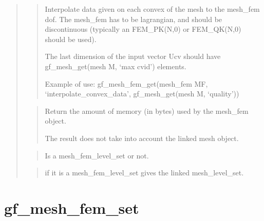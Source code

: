 \documentclass[a4paper,11pt,english]{sphinxmanual}
\begin{document}
\begin{quote}
\begin{quote}
\sphinxAtStartPar
Interpolate data given on each convex of the mesh to the mesh\_fem dof.
The mesh\_fem has to be lagrangian, and should be discontinuous (typically
an FEM\_PK(N,0) or FEM\_QK(N,0) should be used).

\sphinxAtStartPar
The last dimension of the input vector Ucv should have
gf\_mesh\_get(mesh M, ‘max cvid’) elements.

\sphinxAtStartPar
Example of use: gf\_mesh\_fem\_get(mesh\_fem MF, ‘interpolate\_convex\_data’, gf\_mesh\_get(mesh M, ‘quality’))
\end{quote}

\sphinxAtStartPar
{}
\begin{quote}

\sphinxAtStartPar
Return the amount of memory (in bytes) used by the mesh\_fem object.

\sphinxAtStartPar
The result does not take into account the linked mesh object.
\end{quote}

\sphinxAtStartPar
{}
\begin{quote}

\sphinxAtStartPar
Is a mesh\_fem\_level\_set or not.
\end{quote}

\sphinxAtStartPar
{}
\begin{quote}

\sphinxAtStartPar
if it is a mesh\_fem\_level\_set gives the linked mesh\_level\_set.
\end{quote}
\end{quote}


\section{gf\_mesh\_fem\_set}
\label{\detokenize{scilab/cmdref_gf_mesh_fem_set:gf-mesh-fem-set}}\label{\detokenize{scilab/cmdref_gf_mesh_fem_set::doc}}
\sphinxAtStartPar
{}
\end{document}
